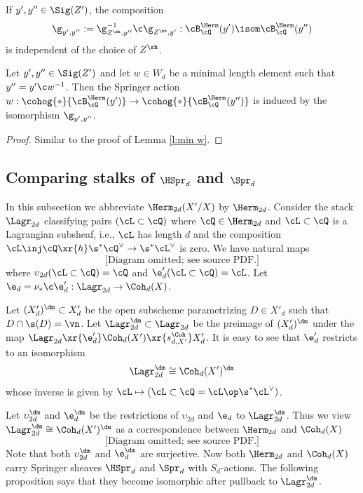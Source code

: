 If $y',y''\in \Sig(Z')$, the composition
\begin{equation*}
\g_{y',y''}:=\g_{Z^{\sh},y''}^{-1}\c\g_{Z^{\sh}, y'}:\cB^{\Herm}_{\cQ}(y')\isom\cB^{\Herm}_{\cQ}(y'')
\end{equation*}
is independent of the choice of $Z^{\sh}$.

\begin{lemma}
\notready\label{l:min w Herm}
Let $y',y''\in \Sig(Z')$ and let $w\in W_{d}$ be a minimal length element such that $y''=y'\c w^{-1}$. Then the Springer action $w: \cohog{*}{\cB^{\Herm}_{\cQ}(y')}\to  \cohog{*}{\cB^{\Herm}_{\cQ}(y'')}$ is induced by the isomorphism $\g_{y', y''}$.
\end{lemma}
\begin{proof}
Similar to the proof of Lemma \ref{l:min w}.
\end{proof}



\subsection{Comparing stalks of $\HSpr_{d}$ and $\Spr_{d}$}\label{ss:HSpr stalk}
In this subsection we abbreviate $\Herm_{2d}(X'/X)$ by $\Herm_{2d}$. Consider the stack $\Lagr_{2d}$ classifying pairs $(\cL\subset\cQ)$ where $\cQ\in\Herm_{2d}$ and $\cL\subset \cQ$ is a Lagrangian subsheaf, i.e., $\cL$ has length $d$ and the composition $\cL\inj \cQ\xr{h}\s^{*}\cQ^{\vee}\to \s^{*}\cL^{\vee}$ is zero. We have natural maps
\begin{equation*}
\text{[Diagram omitted; see source PDF.]}
\end{equation*}
where $\upsilon_{2d}(\cL\subset\cQ)=\cQ$ and $\e'_{d}(\cL\subset\cQ)=\cL$.  Let $\e_{d}=\nu_{*}\c \e'_{d}: \Lagr_{2d}\to \Coh_{d}(X)$.

Let $(X'_{d})^{\dm}\subset X'_{d}$ be the open subscheme parametrizing $D\in X'_{d}$ such that $D\cap\s(D)=\vn$.
Let $\Lagr^{\dm}_{2d}\subset \Lagr_{2d}$ be the preimage of $(X'_{d})^{\dm}$ under the map $\Lagr_{2d}\xr{\e'_{d}}\Coh_{d}(X')\xr{s^{\Coh}_{d,X'}} X'_{d}$.  It is easy to see that $\e'_{d}$ restricts to an isomorphism
\begin{equation*}
\Lagr^{\dm}_{2d}\cong \Coh_{d}(X')^{\dm}
\end{equation*}
whose inverse is given by $\cL\mapsto (\cL\subset \cQ=\cL\op \s^{*}\cL^{\vee})$.

Let $\upsilon^{\dm}_{2d}$ and $\e^{\dm}_{d}$ be the restrictions of $\upsilon_{2d}$ and $\e_{d}$ to $\Lagr^{\dm}_{2d}$. Thus we view $\Lagr^{\dm}_{2d}\cong \Coh_{d}(X')^{\dm}$ as a correspondence between $\Herm_{2d}$ and $\Coh_{d}(X)$
\begin{equation*}
\text{[Diagram omitted; see source PDF.]}
\end{equation*}
Note that both $\upsilon^{\dm}_{2d}$ and $\e^{\dm}_{d}$ are surjective. Now both $\Herm_{2d}$ and $\Coh_{d}(X)$ carry Springer sheaves $\HSpr_{d}$ and $\Spr_{d}$ with $S_{d}$-actions. The following proposition says that they become isomorphic after pullback to $\Lagr^{\dm}_{2d}$.





